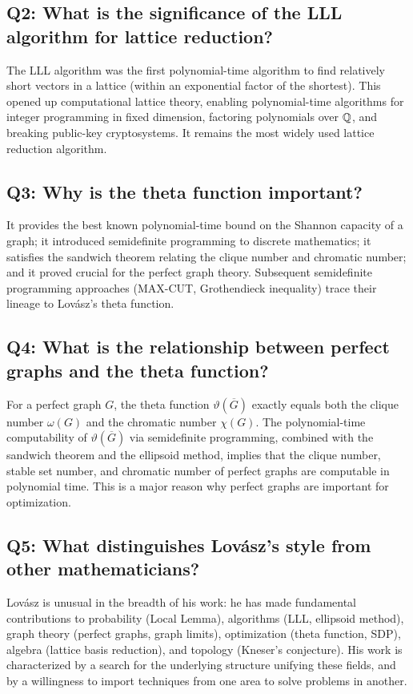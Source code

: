 \subsection*{Q2: What is the significance of the LLL algorithm for lattice reduction?}

The LLL algorithm was the first polynomial-time algorithm to find relatively short vectors in a lattice (within an exponential factor of the shortest). This opened up computational lattice theory, enabling polynomial-time algorithms for integer programming in fixed dimension, factoring polynomials over \(\mathbb{Q}\), and breaking public-key cryptosystems. It remains the most widely used lattice reduction algorithm.

\subsection*{Q3: Why is the theta function important?}

It provides the best known polynomial-time bound on the Shannon capacity of a graph; it introduced semidefinite programming to discrete mathematics; it satisfies the sandwich theorem relating the clique number and chromatic number; and it proved crucial for the perfect graph theory. Subsequent semidefinite programming approaches (MAX-CUT, Grothendieck inequality) trace their lineage to Lov\'{a}sz's theta function.

\subsection*{Q4: What is the relationship between perfect graphs and the theta function?}

For a perfect graph \(G\), the theta function \(\vartheta(\overline{G})\) exactly equals both the clique number \(\omega(G)\) and the chromatic number \(\chi(G)\). The polynomial-time computability of \(\vartheta(\overline{G})\) via semidefinite programming, combined with the sandwich theorem and the ellipsoid method, implies that the clique number, stable set number, and chromatic number of perfect graphs are computable in polynomial time. This is a major reason why perfect graphs are important for optimization.

\subsection*{Q5: What distinguishes Lov\'{a}sz's style from other mathematicians?}

Lov\'{a}sz is unusual in the breadth of his work: he has made fundamental contributions to probability (Local Lemma), algorithms (LLL, ellipsoid method), graph theory (perfect graphs, graph limits), optimization (theta function, SDP), algebra (lattice basis reduction), and topology (Kneser's conjecture). His work is characterized by a search for the underlying structure unifying these fields, and by a willingness to import techniques from one area to solve problems in another.

